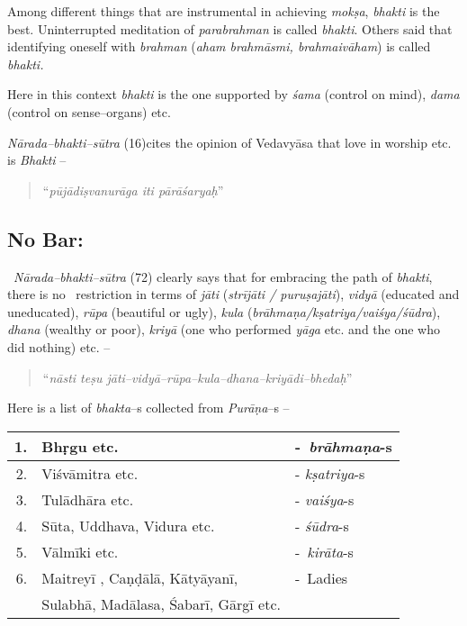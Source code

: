 Among different things that are instrumental in achieving \textit{mokṣa}, \textit{bhakti} is the best. Uninterrupted meditation of \textit{parabrahman} is called \textit{bhakti}. Others said that identifying oneself with \textit{brahman} (\textit{aham brahmāsmi, brahmaivāham}) is called \textit{bhakti.}

Here in this context \textit{bhakti} is the one supported by \textit{śama} (control on mind), \textit{dama} (control on sense–organs) etc.

\textit{Nārada–bhakti–sūtra} (16)cites the opinion of Vedavyāsa that love in worship etc. is \textit{Bhakti} –

\begin{verse}
“\textit{pūjādiṣvanurāga iti pārāśaryaḥ}”
\end{verse}


\subsection*{No Bar:}

 \textit{Nārada–bhakti–sūtra} (72) clearly says that for embracing the path of \textit{bhakti}, there is no  restriction in terms of \textit{jāti} (\textit{strījāti / puruṣajāti}), \textit{vidyā} (educated and uneducated), \textit{rūpa} (beautiful or ugly), \textit{kula} (\textit{brāhmaṇa/kṣatriya/vaiśya/śūdra}), \textit{dhana} (wealthy or poor), \textit{kriyā} (one who performed \textit{yāga} etc. and the one who did nothing) etc. –

\begin{verse}
“\textit{nāsti teṣu jāti–vidyā–rūpa–kula–dhana–kriyādi–bhedaḥ}”
\end{verse}

Here is a list of \textit{bhakta}–s collected from \textit{Purāṇa}–s –

\begin{tabular}{|r|l|l|}
\hline
1. & Bhṛgu etc. & - \textit{brāhmaṇa}-s \\
\hline
2. & Viśvāmitra etc. & - \textit{kṣatriya}-s \\
\hline
3. & Tulādhāra etc. & - \textit{vaiśya}-s \\
\hline
4. & Sūta, Uddhava, Vidura etc. & - \textit{śūdra}-s \\
\hline
5. & Vālmīki etc. & - \textit{kirāta}-s \\
\hline
6. & Maitreyī , Caṇḍālā, Kātyāyanī, & - Ladies \\
\hline
 & Sulabhā, Madālasa, Śabarī, Gārgī etc. &  \\
\hline
\end{tabular}

